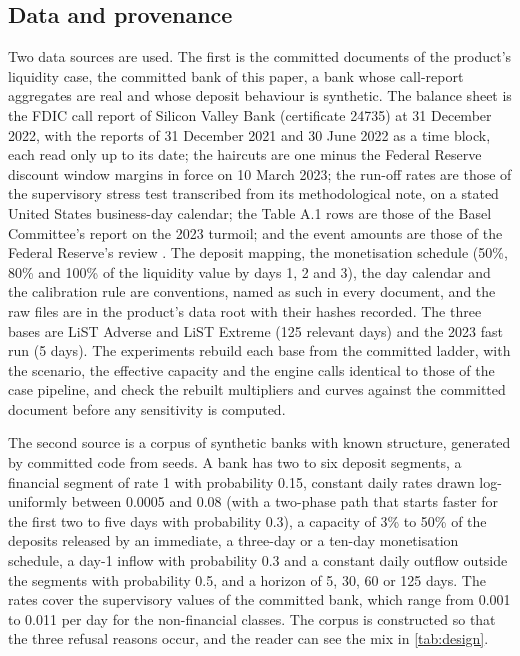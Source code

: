 \subsection{Data and provenance}

Two data sources are used. The first is the committed documents of the product's liquidity case, the committed bank of this paper, a bank whose call-report aggregates are real and whose deposit behaviour is synthetic. The balance sheet is the FDIC call report of Silicon Valley Bank (certificate 24735) at 31 December 2022, with the reports of 31 December 2021 and 30 June 2022 as a time block, each read only up to its date; the haircuts are one minus the Federal Reserve discount window margins in force on 10 March 2023; the run-off rates are those of the supervisory stress test transcribed from its methodological note, on a stated United States business-day calendar; the Table A.1 rows are those of the Basel Committee's report on the 2023 turmoil; and the event amounts are those of the Federal Reserve's review \citep{ecblist2019,bcbs555,fedsvb2023}. The deposit mapping, the monetisation schedule (50\%, 80\% and 100\% of the liquidity value by days 1, 2 and 3), the day calendar and the calibration rule are conventions, named as such in every document, and the raw files are in the product's data root with their hashes recorded. The three bases are LiST Adverse and LiST Extreme (125 relevant days) and the 2023 fast run (5 days). The experiments rebuild each base from the committed ladder, with the scenario, the effective capacity and the engine calls identical to those of the case pipeline, and check the rebuilt multipliers and curves against the committed document before any sensitivity is computed.

The second source is a corpus of synthetic banks with known structure, generated by committed code from seeds. A bank has two to six deposit segments, a financial segment of rate 1 with probability 0.15, constant daily rates drawn log-uniformly between 0.0005 and 0.08 (with a two-phase path that starts faster for the first two to five days with probability 0.3), a capacity of 3\% to 50\% of the deposits released by an immediate, a three-day or a ten-day monetisation schedule, a day-1 inflow with probability 0.3 and a constant daily outflow outside the segments with probability 0.5, and a horizon of 5, 30, 60 or 125 days. The rates cover the supervisory values of the committed bank, which range from 0.001 to 0.011 per day for the non-financial classes. The corpus is constructed so that the three refusal reasons occur, and the reader can see the mix in \cref{tab:design}.

